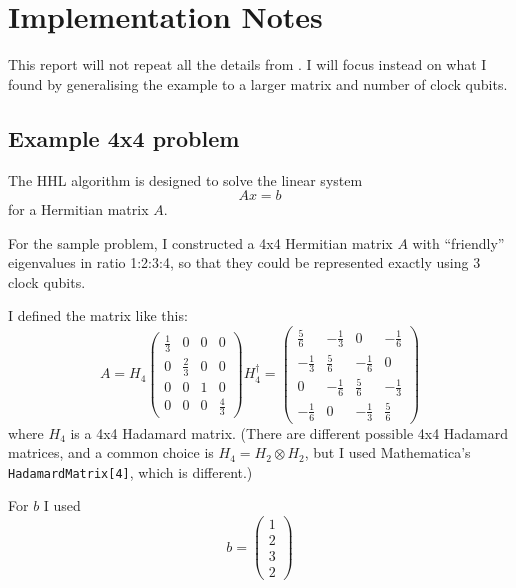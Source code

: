 \documentclass[12pt]{extarticle}
\begin{document}
\section{Implementation Notes}\label{sec:implementation}

This report will not repeat all the details from \cite{zaman2023step}.
I will focus instead on what I found by generalising the example to a larger matrix and number of clock qubits.

\subsection{Example 4x4 problem}

The HHL algorithm is designed to solve the linear system
\begin{equation}\label{eq:linearsystem}
Ax = b
\end{equation}
for a Hermitian matrix $A$.

For the sample problem, I constructed a 4x4 Hermitian matrix $A$ with ``friendly'' eigenvalues in ratio 1:2:3:4,
so that they could be represented exactly using 3 clock qubits.

I defined the matrix like this:
\begin{equation}\label{eq:matrixa4}
A = H_4 \begin{pmatrix}
    \frac{1}{3} & 0 & 0 & 0 \\
    0 & \frac{2}{3} & 0 & 0 \\
    0 & 0 & 1 & 0 \\
    0 & 0 & 0 & \frac{4}{3}
\end{pmatrix} H_4^{\dagger}
= \begin{pmatrix}
    \frac{5}{6} & -\frac{1}{3} & 0 & -\frac{1}{6} \\
    -\frac{1}{3} & \frac{5}{6} & -\frac{1}{6} & 0 \\
    0 & -\frac{1}{6} & \frac{5}{6} & -\frac{1}{3} \\
    -\frac{1}{6} & 0 & -\frac{1}{3} & \frac{5}{6}
\end{pmatrix}
\end{equation}
where $H_4$ is a 4x4 Hadamard matrix.
(There are different possible 4x4 Hadamard matrices, and a common choice is $H_4=H_2\otimes H_2$, but I used Mathematica's \texttt{HadamardMatrix[4]}, which is different.)

For $b$ I used
\begin{equation}\label{eq:vectorb4}
b = \begin{pmatrix} 1 \\ 2 \\ 3 \\ 2 \end{pmatrix}
\end{equation}
\end{document}
